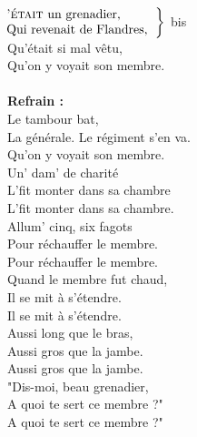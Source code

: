 
 \\
$\left.\begin{tabular}{l}
\hspace{-0.4cm}
\textsc{'était} un grenadier,
\\
\hspace{-0.4cm}
Qui revenait de Flandres,
\end{tabular}\right\rbrace$ bis
\\Qu'était si mal vêtu,
\\Qu'on y voyait son membre.
\\\\\textbf{Refrain :}
\\Le tambour bat,
\\La générale.
{Le régiment s'en va.}
\\
{Qu'on y voyait son membre.}
\\Un' dam' de charité
\\L'fit monter dans sa chambre
\\
{L'fit monter dans sa chambre. }
\\Allum' cinq, six fagots
\\Pour réchauffer le membre.
\\
{Pour réchauffer le membre. ~~}
\\Quand le membre fut chaud,
\\Il se mit à s'étendre.
\\
{Il se mit à s'étendre.}
\\Aussi long que le bras,
\\Aussi gros que la jambe.
\\
{Aussi gros que la jambe. ~~}
\\"Dis-moi, beau grenadier,
\\A quoi te sert ce membre ?"
\breakpage
\\
{A quoi te sert ce membre ?"}

